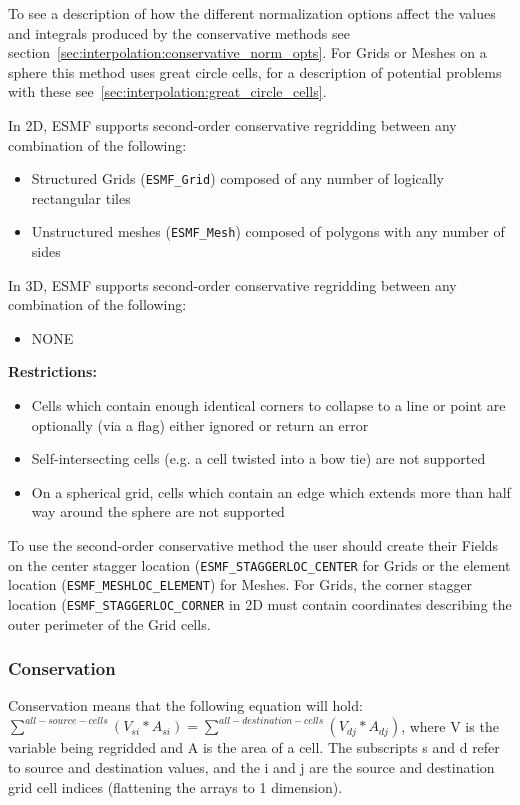 \smallskip

 To see a description of how the different normalization options affect the values and integrals produced by the conservative methods see section~\ref{sec:interpolation:conservative_norm_opts}. For Grids or Meshes on a sphere this method uses great circle cells, for a description of potential problems with these see~\ref{sec:interpolation:great_circle_cells}.

\smallskip

 In 2D, ESMF supports second-order conservative regridding between any combination of the following:
 \begin{itemize}
 \item Structured Grids ({\tt ESMF\_Grid}) composed of any number of logically rectangular tiles
 \item Unstructured meshes ({\tt ESMF\_Mesh}) composed of polygons with any number of sides
 \end{itemize}

\smallskip

 In 3D, ESMF supports second-order conservative regridding between any combination of the following:
 \begin{itemize}
 \item NONE
 \end{itemize}

\smallskip

{\bf Restrictions:}
 \begin{itemize}
 \item Cells which contain enough identical corners to collapse to a line or point are optionally (via a flag) either ignored or return an error
 \item Self-intersecting cells (e.g. a cell twisted into a bow tie) are not supported
 \item On a spherical grid, cells which contain an edge which extends more than half way around the sphere are not supported 
 \end{itemize}
 
\smallskip

 To use the second-order conservative method the user should create their Fields on the center 
 stagger location ({\tt ESMF\_STAGGERLOC\_CENTER} for Grids  or the element location ({\tt ESMF\_MESHLOC\_ELEMENT}) for Meshes.
 For Grids, the corner stagger location ({\tt ESMF\_STAGGERLOC\_CORNER} in 2D must contain coordinates describing the outer perimeter of the Grid cells. 

\subsubsection{Conservation}\label{sec:interpolation:conservation}
 Conservation means that the following equation will hold:  $\sum^{all-source-cells}(V_{si}*A_{si}) = \sum^{all-destination-cells}(V_{dj}*A_{dj})$, where
 V is the variable being regridded and A is the area of a cell.  The subscripts s and d refer to source and destination values, and the i and j are the source  and destination grid cell indices (flattening the arrays to 1 dimension). 

